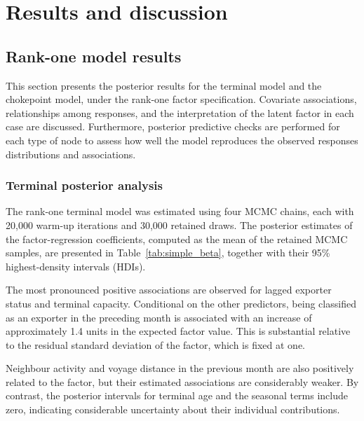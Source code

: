 \documentclass[pdftex,12pt,openright,a4paper,oneside]{book}
\begin{document}
\chapter{Results and discussion}
\label{chap:results}

\section{Rank-one model results}
\label{sec: rank-one model}
This section presents the posterior results for the terminal
model and the chokepoint model, under the rank-one factor
specification. Covariate associations, relationships among
responses, and the interpretation of the latent factor in each
case are discussed. Furthermore, posterior predictive checks
are performed for each type of node to assess how well the
model reproduces the observed responses distributions and
associations.

\subsection{Terminal posterior analysis}
\label{sec:terminal_results}

The rank-one terminal model was estimated using four MCMC chains,
each with 20,000 warm-up iterations and 30,000 retained draws.
The posterior estimates of the factor-regression coefficients,
computed as the mean of the retained MCMC samples,
are presented in Table~\ref{tab:simple_beta}, together with
their 95\% highest-density intervals (HDIs).

The most pronounced positive associations are observed for lagged
exporter status and terminal capacity. Conditional on the
other predictors, being classified as an exporter
in the preceding month is associated with an increase of
approximately 1.4 units in the expected factor value.
This is substantial relative to the residual standard
deviation of the factor, which is fixed at one.

Neighbour activity and voyage distance in the previous
month are also positively related to the factor, but
their estimated associations are considerably weaker.
By contrast, the posterior intervals for terminal age
and the seasonal terms include zero, indicating considerable
uncertainty about their individual contributions.
\end{document}
